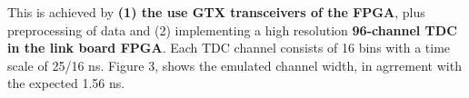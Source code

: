 
\hfill

This is achieved by \textbf{(1) the use GTX transceivers of the FPGA}, plus preprocessing of data and (2) implementing a high resolution \textbf{96-channel TDC in the link board FPGA}. Each TDC channel consists of 16 bins with a time scale of 25/16 ns. Figure 3, shows the emulated channel width, in agrrement with the expected 1.56 ns. 







